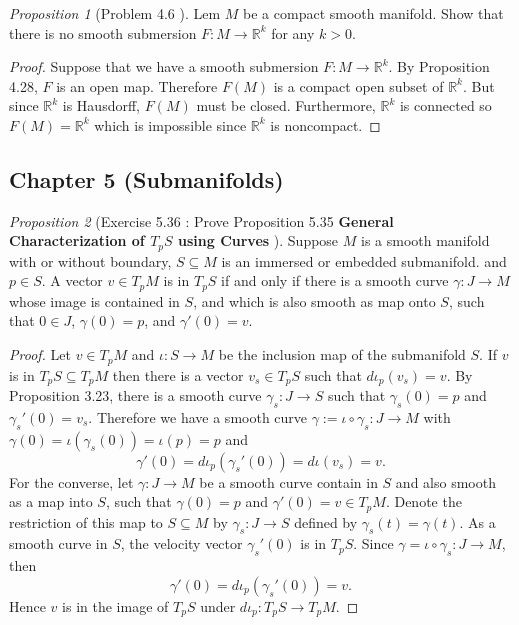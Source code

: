 \documentclass[a4paper]{article}
\theoremstyle{remark}
\newtheorem{prop}{Proposition}
\newcommand{\rk}{\mathbb{R}^k} %
\newcommand{\subhim}{\subseteq} %
\begin{document}
\begin{prop}[Problem 4.6 \cite{LeeSM}]
Lem $M$ be a compact smooth manifold. Show that there is no smooth submersion $F : M \to \rk$ for any $k>0$.
\end{prop}
\begin{proof}
Suppose that we have a smooth submersion $F : M \to \rk$. By Proposition 4.28, $F$ is an open map. Therefore $F(M)$ is a compact open subset of $\rk$. But since $\rk$ is Hausdorff, $F(M)$ must be closed. Furthermore, $\rk$ is connected so $F(M) = \rk$ which is impossible since $\rk$ is noncompact.
\end{proof}

\subsection{Chapter 5 (Submanifolds)}

\begin{prop}[Exercise 5.36 \cite{LeeSM} : Prove Proposition 5.35 \textbf{General Characterization of \boldmath$T_pS$ using Curves} ]
Suppose $M$ is a smooth manifold with or without boundary, $S \subhim M$ is an immersed or embedded submanifold. and $p \in S$. A vector $v \in T_pM$ is in $T_pS$ if and only if there is a smooth curve $\gamma : J \to M$ whose image is contained in $S$, and which is also smooth as map onto $S$, such that $0 \in J$, $\gamma(0) = p$, and $\gamma'(0)=v$. 
\end{prop}
\begin{proof}
Let $v \in T_pM$ and $\iota : S \to M$ be the inclusion map of the submanifold $S$. If $v$ is in $T_pS \subhim T_pM$ then there is a vector $v_s \in T_pS$ such that $d\iota_p (v_s) = v$. By Proposition 3.23, there is a smooth curve $\gamma_s : J \to S$ such that $\gamma_s(0)=p$ and $\gamma_s'(0) = v_s$. Therefore we have a smooth curve
$\gamma := \iota \circ \gamma_s : J \to M$ with $\gamma(0) = \iota(\gamma_s(0)) = \iota(p) = p$ and 
$$
\gamma'(0) = d\iota_p (\gamma_s'(0)) = d\iota(v_s) = v.
$$
For the converse, let $\gamma : J \to M$ be a smooth curve contain in $S$ and also smooth as a map into $S$, such that $\gamma(0)=p$ and $\gamma'(0) = v \in T_pM$. Denote the restriction of this map to $S\subhim M$ by $\gamma_s : J \to S$ defined by $\gamma_s(t) = \gamma(t)$. As a smooth curve in $S$, the velocity vector $\gamma_s'(0)$ is in $T_pS$. Since $\gamma = \iota \circ \gamma_s :J \to M$, then
$$
\gamma'(0) = d\iota_p(\gamma_s'(0)) = v.
$$ 
Hence $v$ is in the image of $T_pS$ under $d\iota_p : T_pS \to T_pM$.
\end{proof}
\end{document}
